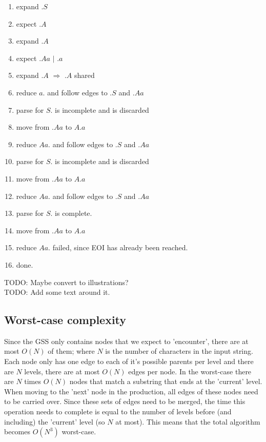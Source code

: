 \documentclass[a4paper,10pt]{article}
\begin{document}
\begin{enumerate}
 \setlength{\itemsep}{0pt}
 \setlength{\parskip}{0pt}
 \setlength{\parsep}{0pt}
 
 \item expand $.S$
 \item expect $.A$
 \item expand $.A$
 \item expect $.Aa$ $|$ $.a$
 \item expand $.A$ $\Rightarrow$ $.A$ shared
 \item reduce $a.$ and follow edges to $.S$ and $.Aa$
 \item parse for $S.$ is incomplete and is discarded
 \item move from $.Aa$ to $A.a$
 \item reduce $Aa.$ and follow edges to $.S$ and $.Aa$
 \item parse for $S.$ is incomplete and is discarded
 \item move from $.Aa$ to $A.a$
 \item reduce $Aa.$ and follow edges to $.S$ and $.Aa$
 \item parse for $S.$ is complete.
 \item move from $.Aa$ to $A.a$
 \item reduce $Aa.$ failed, since EOI has already been reached.
 \item done.
\end{enumerate}

TODO: Maybe convert to illustrations?\\
TODO: Add some text around it.

\subsection{Worst-case complexity}

Since the GSS only contains nodes that we expect to 'encounter', there are at most $O(N)$ of them; where $N$ is the number of characters in the input string. Each node only has one edge to each of it's possible parents per level and there are $N$ levels, there are at most $O(N)$ edges per node. In the worst-case there are $N$ times $O(N)$ nodes that match a substring that ends at the 'current' level. When moving to the 'next' node in the production, all edges of these nodes need to be carried over. Since these sets of edges need to be merged, the time this operation needs to complete is equal to the number of levels before (and including) the 'current' level (so $N$ at most). This means that the total algorithm becomes $O(N^3)$ worst-case.
\end{document}
